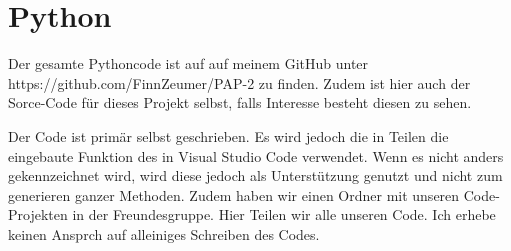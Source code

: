 \chapter{Python}
\label{ch:Python}


Der gesamte Pythoncode ist auf auf meinem GitHub unter https://github.com/FinnZeumer/PAP-2 \cite{githubPAP2} zu finden. Zudem ist hier auch der Sorce-Code für dieses Projekt selbst, falls Interesse besteht diesen zu sehen.

Der Code ist primär selbst geschrieben. Es wird jedoch die in Teilen die eingebaute Funktion des  in Visual Studio Code verwendet. Wenn es nicht anders gekennzeichnet wird, wird diese jedoch als Unterstützung genutzt und nicht zum generieren ganzer Methoden. 
Zudem haben wir einen Ordner mit unseren Code-Projekten in der Freundesgruppe. Hier Teilen wir alle unseren Code. Ich erhebe keinen Ansprch auf alleiniges Schreiben des Codes.



